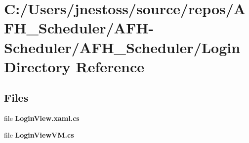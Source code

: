 \section{C\+:/\+Users/jnestoss/source/repos/\+A\+F\+H\+\_\+\+Scheduler/\+A\+F\+H-\/\+Scheduler/\+A\+F\+H\+\_\+\+Scheduler/\+Login Directory Reference}
\label{dir_f60588a0d4a264af4e5b40ab9617df2e}
\subsection*{Files}
\begin{DoxyCompactItemize}
\item 
file \textbf{ Login\+View.\+xaml.\+cs}
\item 
file \textbf{ Login\+View\+V\+M.\+cs}
\end{DoxyCompactItemize}
